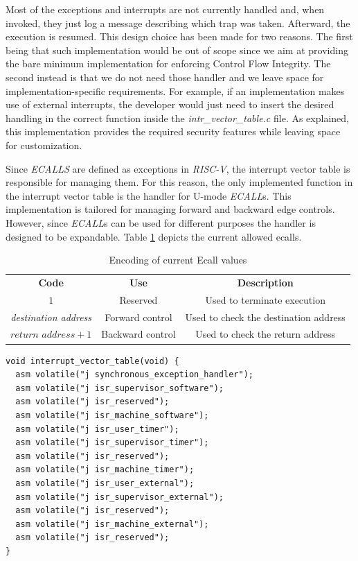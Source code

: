 Most of the exceptions and interrupts are not currently handled and, when invoked,
they just log a message describing which trap was taken. Afterward, the
execution is resumed. This design choice has been made for two reasons. The
first being that such implementation would be out of scope since we aim at
providing the bare minimum implementation for enforcing Control Flow Integrity. The
second instead is that we do not need those handler and we leave space for implementation-specific
requirements. For example, if an implementation makes use of external interrupts,
the developer would just need to insert the desired handling in the correct
function inside the \textit{intr\_vector\_table.c} file. As explained, this implementation
provides the required security features while leaving space for customization.

Since \textit{ECALLS} are defined as exceptions in \textit{RISC-V}, the
interrupt vector table is responsible for managing them. For this reason, the
only implemented function in the interrupt vector table is the handler for U-mode
\textit{ECALL}s. This implementation is tailored for managing forward and backward
edge controls. However, since \textit{ECALL}s can be used for different purposes
the handler is designed to be expandable. Table \ref{tab:ecalls} depicts the
current allowed ecalls.

\begin{table}
  \centering
  \begin{tabular}{|c|c|c|}
    \hline
    \textbf{Code}                & \textbf{Use}     & \textbf{Description}                  \\
    \hhline{===} $1$             & Reserved         & Used to terminate execution           \\
    \hline
    \textit{destination address} & Forward control  & Used to check the destination address \\
    \hline
    $\textit{return address}+ 1$ & Backward control & Used to check the return address      \\
    \hline
  \end{tabular}
  \caption{Encoding of current Ecall values}
  \label{tab:ecalls}
\end{table}

\begin{lstlisting}[style=CStyle, caption = Interrput Vector Table, label={lst:intrtable}]
void interrupt_vector_table(void) {
  asm volatile("j synchronous_exception_handler");
  asm volatile("j isr_supervisor_software");
  asm volatile("j isr_reserved");
  asm volatile("j isr_machine_software");
  asm volatile("j isr_user_timer");
  asm volatile("j isr_supervisor_timer");
  asm volatile("j isr_reserved");
  asm volatile("j isr_machine_timer");
  asm volatile("j isr_user_external");
  asm volatile("j isr_supervisor_external");
  asm volatile("j isr_reserved");
  asm volatile("j isr_machine_external");
  asm volatile("j isr_reserved");
}
\end{lstlisting}

